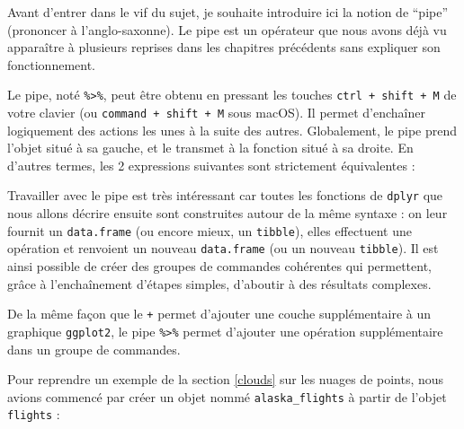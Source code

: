 \documentclass[a4paperpaper,]{article}
\newenvironment{Shaded}{\begin{snugshade}}{\end{snugshade}}
\newcommand{\CommentTok}[1]{\textcolor[rgb]{0.54,0.53,0.53}{#1}}
\newcommand{\KeywordTok}[1]{\textcolor[rgb]{0.12,0.11,0.11}{\textbf{#1}}}
\newcommand{\NormalTok}[1]{\textcolor[rgb]{0.12,0.11,0.11}{#1}}
\newcommand{\OperatorTok}[1]{\textcolor[rgb]{0.12,0.11,0.11}{#1}}
\newcommand{\StringTok}[1]{\textcolor[rgb]{0.75,0.01,0.01}{#1}}
\begin{document}
Avant d'entrer dans le vif du sujet, je souhaite introduire ici la notion de ``pipe'' (prononcer à l'anglo-saxonne). Le pipe est un opérateur que nous avons déjà vu apparaître à plusieurs reprises dans les chapitres précédents sans expliquer son fonctionnement.

Le pipe, noté \texttt{\%\textgreater{}\%}, peut être obtenu en pressant les touches \texttt{ctrl\ +\ shift\ +\ M} de votre clavier (ou \texttt{command\ +\ shift\ +\ M} sous macOS). Il permet d'enchaîner logiquement des actions les unes à la suite des autres. Globalement, le pipe prend l'objet situé à sa gauche, et le transmet à la fonction situé à sa droite. En d'autres termes, les 2 expressions suivantes sont strictement équivalentes :

\begin{Shaded}
\end{Shaded}

Travailler avec le pipe est très intéressant car toutes les fonctions de \texttt{dplyr} que nous allons décrire ensuite sont construites autour de la même syntaxe : on leur fournit un \texttt{data.frame} (ou encore mieux, un \texttt{tibble}), elles effectuent une opération et renvoient un nouveau \texttt{data.frame} (ou un nouveau \texttt{tibble}). Il est ainsi possible de créer des groupes de commandes cohérentes qui permettent, grâce à l'enchaînement d'étapes simples, d'aboutir à des résultats complexes.

De la même façon que le \texttt{+} permet d'ajouter une couche supplémentaire à un graphique \texttt{ggplot2}, le pipe \texttt{\%\textgreater{}\%} permet d'ajouter une opération supplémentaire dans un groupe de commandes.

Pour reprendre un exemple de la section \ref{clouds} sur les nuages de points, nous avions commencé par créer un objet nommé \texttt{alaska\_flights} à partir de l'objet \texttt{flights} :

\begin{Shaded}
\end{Shaded}
\end{document}
